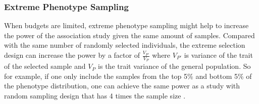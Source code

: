 	\subsubsection{Extreme Phenotype Sampling}
	When budgets are limited, extreme phenotype sampling might help to increase the power of the association study given the same amount of samples. 
	Compared with the same number of randomly selected individuals, the extreme selection design can increase the power by a factor of $\frac{V_{P'}}{V_P}$ where $V_{P'}$ is variance of the trait of the selected sample and $V_P$ is the trait variance of the general population.
	So for example, if one only include the samples from the top 5\% and bottom 5\% of the phenotype distribution, one can achieve the same power as a study with random sampling design that has 4 times the sample size \citep{Sham2014}. 
	
